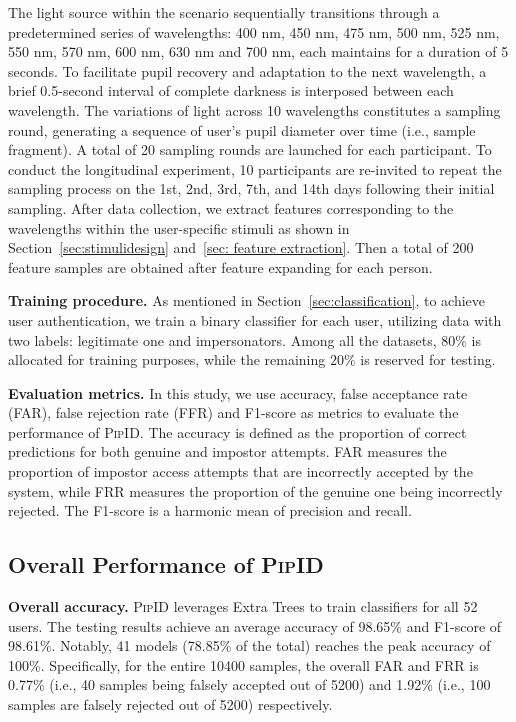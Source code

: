 \documentclass[sigconf]{acmart}
\newcommand{\sysname}{\textsc{PipID}\xspace}
\begin{document}
The light source within the scenario sequentially transitions through a predetermined series of wavelengths: 400 nm, 450 nm, 475 nm, 500 nm, 525 nm, 550 nm, 570 nm, 600 nm, 630 nm and 700 nm, each maintains for a duration of 5 seconds. To facilitate pupil recovery and adaptation to the next wavelength, a brief 0.5-second interval of complete darkness is interposed between each wavelength. The variations of light across 10 wavelengths constitutes a sampling round, generating a sequence of user's pupil diameter over time (i.e., sample fragment). A total of 20 sampling rounds are launched for each participant. To conduct the longitudinal experiment, 10 participants are re-invited to repeat the sampling process on the 1st, 2nd, 3rd, 7th, and 14th days following their initial sampling. After data collection, we extract features corresponding to the wavelengths within the user-specific stimuli as shown in Section~\ref{sec:stimulidesign} and~\ref{sec: feature extraction}. Then a total of 200 feature samples are obtained after feature expanding for each person.

\noindent \textbf{Training procedure.}
As mentioned in Section~\ref{sec:classification}, to achieve user authentication, we train a binary classifier for each user, utilizing data with two labels: legitimate one and impersonators. Among all the datasets, $80\%$ is allocated for training purposes, while the remaining $20\%$ is reserved for testing.

\noindent \textbf{Evaluation metrics.}
In this study, we use accuracy, false acceptance rate (FAR), false rejection rate (FFR) and F1-score as metrics to evaluate the performance of \sysname. The accuracy is defined as the proportion of correct predictions for both genuine and impostor attempts. FAR measures the proportion of impostor access attempts that are incorrectly accepted by the system, while FRR measures the proportion of the genuine one being incorrectly rejected. The F1-score is a harmonic mean of precision and recall.



\subsection{Overall Performance of \sysname}
\label{sec:overall performance}
\noindent   \textbf{Overall accuracy.}
\sysname leverages Extra Trees to train classifiers for all 52 users. The testing results achieve an average accuracy of 98.65\% and F1-score of 98.61\%. Notably, 41 models (78.85\% of the total) reaches the peak accuracy of 100\%. Specifically, for the entire 10400 samples, the overall FAR and FRR is 0.77\% (i.e., 40 samples being falsely accepted out of 5200) and 1.92\% (i.e., 100 samples are falsely rejected out of 5200) respectively.
\end{document}
